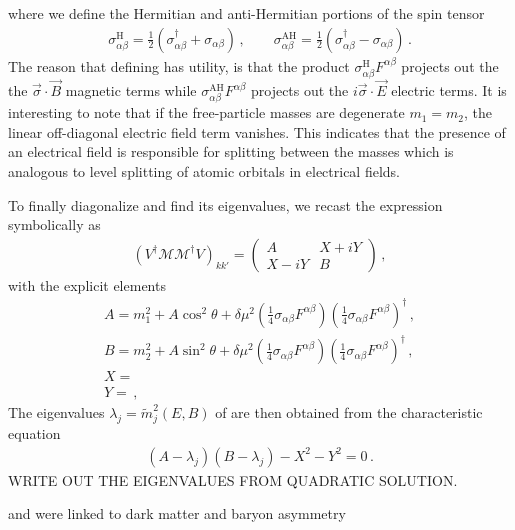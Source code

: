 where we define the Hermitian and anti-Hermitian portions of the spin tensor
\begin{align}
    \label{antiherm:1}
    \sigma_{\alpha\beta}^\mathrm{H}=\frac{1}{2}\left(\sigma_{\alpha\beta}^{\dag} + \sigma_{\alpha\beta}\right)\,,\qquad
    \sigma_{\alpha\beta}^\mathrm{AH}=\frac{1}{2}\left(\sigma_{\alpha\beta}^{\dag} - \sigma_{\alpha\beta}\right)\,.
\end{align}
The reason that defining  has utility, is that the product $\sigma_{\alpha\beta}^\mathrm{H}F^{\alpha\beta}$ projects out the the $\vec{\sigma}\cdot\vec{B}$ magnetic terms while $\sigma_{\alpha\beta}^\mathrm{AH}F^{\alpha\beta}$ projects out the $i\vec{\sigma}\cdot\vec{E}$ electric terms. It is interesting to note that if the free-particle masses are degenerate $m_{1}=m_{2}$, the linear off-diagonal electric field term vanishes. This indicates that the presence of an electrical field is responsible for splitting between the masses which is analogous to level splitting of atomic orbitals in electrical fields.

To finally diagonalize  and find its eigenvalues, we recast the expression symbolically as
\begin{align}
    \label{hermz:5}
    (V^{\dag}\mathcal{M}\mathcal{M}^{\dag}V)_{kk'} =
    \begin{pmatrix}
        A & X+iY\\
        X-iY & B
    \end{pmatrix}\,,
\end{align}
with the explicit elements
\begin{align}
    A = m_{1}^{2}+A\cos^{2}\theta+\delta\mu^{2}\left(\frac{1}{4}\sigma_{\alpha\beta}F^{\alpha\beta}\right)\left(\frac{1}{4}\sigma_{\alpha\beta}F^{\alpha\beta}\right)^{\dag}\,,\\
    B = m_{2}^{2}+A\sin^{2}\theta+\delta\mu^{2}\left(\frac{1}{4}\sigma_{\alpha\beta}F^{\alpha\beta}\right)\left(\frac{1}{4}\sigma_{\alpha\beta}F^{\alpha\beta}\right)^{\dag}\,,\\
    X = \\
    Y =\,,
\end{align}
The eigenvalues $\lambda_{j}=\widetilde m_{j}^{2}(E,B)$ of  are then obtained from the characteristic equation
\begin{align}
    (A-\lambda_{j})(B-\lambda_{j})-X^{2}-Y^{2}=0\,.
\end{align}
WRITE OUT THE EIGENVALUES FROM QUADRATIC SOLUTION.


 and were linked to dark matter and baryon asymmetry~\cite{Asaka:2005pn,Boyarsky:2009ix}

